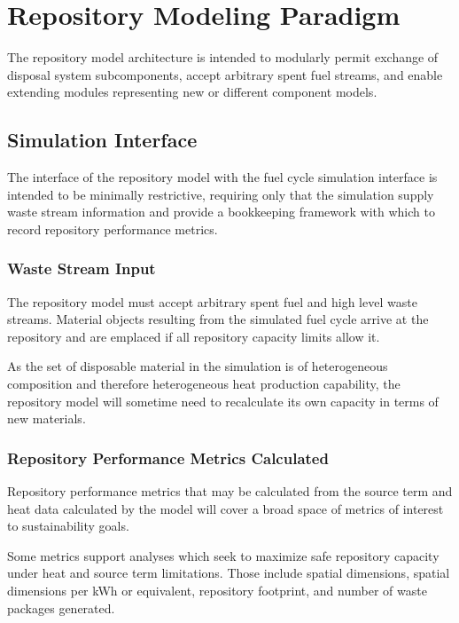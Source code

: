 \section{Repository Modeling Paradigm}

The repository model architecture is intended to modularly permit 
exchange of disposal system subcomponents, accept arbitrary spent fuel 
streams, and enable extending modules representing new or different 
component models.

\subsection{Simulation Interface}

The interface of the repository model with the \Cyclus fuel cycle 
simulation interface is intended to be minimally restrictive, 
requiring only that the simulation supply waste stream information and 
provide a bookkeeping framework with which to record repository 
performance metrics. 

\subsubsection{Waste Stream Input}

The repository model must accept arbitrary spent fuel and high level waste
streams.  Material objects resulting from the simulated fuel cycle arrive at 
the  repository and are emplaced if all repository capacity limits allow 
it.

As the set of disposable material in the simulation is of heterogeneous 
composition and therefore heterogeneous heat production capability, the 
repository model will sometime need to recalculate its own capacity in terms of  
new materials.

\subsubsection{Repository Performance Metrics Calculated}

Repository performance metrics that may be calculated from the source 
term and heat data calculated by the model will cover a broad space of 
metrics of interest to sustainability goals. 

Some metrics support analyses which seek to maximize safe repository 
capacity under heat and source term limitations. Those include spatial 
dimensions, spatial dimensions per kWh or equivalent, repository 
footprint, and number of waste packages generated.

